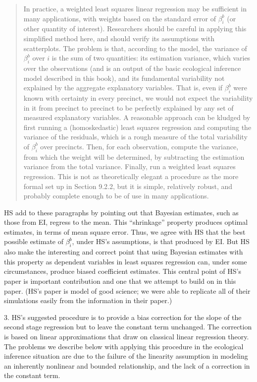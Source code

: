 \documentclass[11pt,titlepage]{article}
\begin{document}
\begin{quotation}
  In practice, a weighted least squares linear regression may be
  sufficient in many applications, with weights based on the standard
  error of $\beta_i^b$ (or other quantity of interest).  Researchers
  should be careful in applying this simplified method here, and
  should verify its assumptions with scatterplots.  The problem is
  that, according to the model, the variance of $\beta_i^b$ over $i$
  is the sum of two quantities: its estimation variance, which varies
  over the observations (and is an output of the basic ecological
  inference model described in this book), and its fundamental
  variability not explained by the aggregate explanatory variables.
  That is, even if $\beta_i^b$ were known with certainty in every
  precinct, we would not expect the variability in it from precinct to
  precinct to be perfectly explained by any set of measured
  explanatory variables.  A reasonable approach can be kludged by
  first running a (homoskedastic) least squares regression and
  computing the variance of the residuals, which is a rough measure of
  the total variability of $\beta_i^b$ over precincts.  Then, for each
  observation, compute the variance, from which the weight will be
  determined, by subtracting the estimation variance from the total
  variance.  Finally, run a weighted least squares regression.  This
  is not as theoretically elegant a procedure as the more formal set
  up in Section 9.2.2, but it is simple, relatively robust, and
  probably complete enough to be of use in many applications.
\end{quotation}  

HS add to these paragraphs by pointing out that Bayesian estimates,
such as those from EI, regress to the mean.  This ``shrinkage''
property produces optimal estimates, in terms of mean square error.
Thus, we agree with HS that the best possible estimate of $\beta^b_i$,
under HS's assumptions, is that produced by EI.  But HS also make the
interesting and correct point that using Bayesian estimates with this
property as dependent variables in least squares regression can, under
some circumstances, produce biased coefficient estimates.  This
central point of HS's paper is important contribution and one that we
attempt to build on in this paper.  (HS's paper is model of good
science; we were able to replicate all of their simulations easily
from the information in their paper.)



3.  HS's suggested procedure is to provide a bias correction for the
slope of the second stage regression but to leave the constant term
unchanged.  The correction is based on linear approximations that draw
on classical linear regression theory.  The problems we describe below
with applying this procedure in the ecological inference situation are
due to the failure of the linearity assumption in modeling an
inherently nonlinear and bounded relationship, and the lack of a
correction in the constant term.
\end{document}

